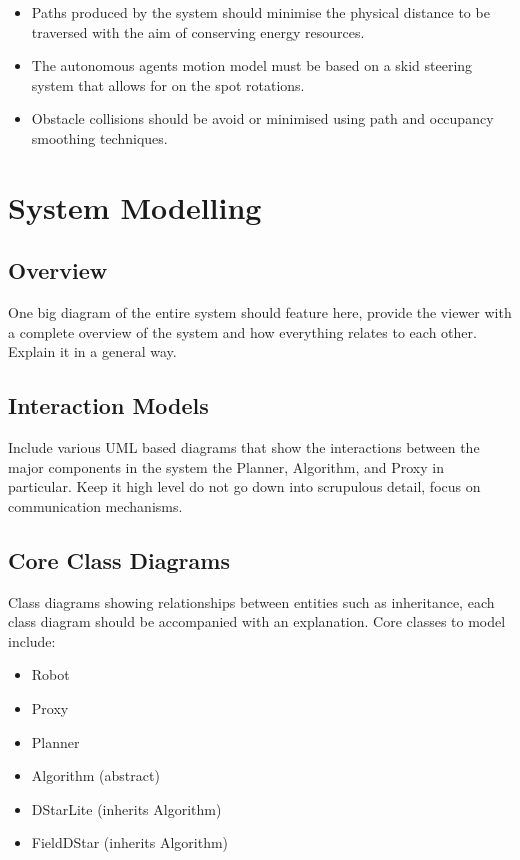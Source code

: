 \begin{itemize}
\item Paths produced by the system should minimise the physical distance to be traversed with the aim of conserving energy resources.
\item The autonomous agents motion model must be based on a skid steering system that allows for on the spot rotations.
\item Obstacle collisions should be avoid or minimised using path and occupancy smoothing techniques.
\end{itemize}

\newpage


\section{System Modelling}

\subsection{Overview}
One big diagram of the entire system should feature here, provide the viewer with a complete overview of the system and how everything relates to each other. Explain it in a general way.

\subsection{Interaction Models}
Include various UML based diagrams that show the interactions between the major components in the system the Planner, Algorithm, and Proxy in particular. Keep it high level do not go down into scrupulous detail, focus on communication mechanisms. 

\subsection{Core Class Diagrams}

\noindent
Class diagrams showing relationships between entities such as inheritance, each class diagram should be accompanied with an explanation. Core classes to model include:

\begin{itemize}
\item Robot
\item Proxy
\item Planner
\item Algorithm (abstract)
\item DStarLite (inherits Algorithm)
\item FieldDStar (inherits Algorithm)
\end{itemize} 

